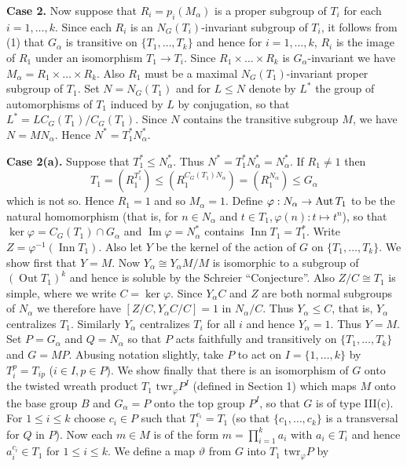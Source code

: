 \textbf{Case 2.} Now suppose that $R_i = p_i(M_\alpha)$ is a proper subgroup of $T_i$ for each $i=1, \dots, k$. Since each $R_i$ is an $N_G(T_i)$-invariant subgroup of $T_i$, it follows from (1) that $G_\alpha$ is transitive on $\{T_1, \dots, T_k\}$ and hence for $i=1, \dots, k$, $R_i$ is the image of $R_1$ under an isomorphism $T_1 \to T_i$. Since $R_1 \times \dots \times R_k$ is $G_\alpha$-invariant we have $M_\alpha = R_1 \times \dots \times R_k$. Also $R_1$ must be a maximal $N_G(T_1)$-invariant proper subgroup of $T_1$. Set $N = N_G(T_1)$ and for $L \le N$ denote by $L^*$ the group of automorphisms of $T_1$ induced by $L$ by conjugation, so that $L^* = LC_G(T_1)/C_G(T_1)$. Since $N$ contains the transitive subgroup $M$, we have $N=MN_\alpha$. Hence $N^*=T_1^*N_\alpha^*$.

\textbf{Case 2(a).} Suppose that $T_1^* \le N_\alpha^*$. Thus $N^*=T_1^*N_\alpha^* = N_\alpha^*$. If $R_1 \neq 1$ then
$$T_1 = (R_1^{T_1^*}) \le (R_1^{C_G(T_1)N_\alpha}) = (R_1^{N_\alpha}) \le G_\alpha $$
which is not so. Hence $R_1=1$ and so $M_\alpha=1$. Define $\varphi: N_\alpha \to \operatorname{Aut} T_1$ to be the natural homomorphism (that is, for $n \in N_\alpha$ and $t \in T_1, \varphi(n): t \mapsto t^n$), so that $\ker \varphi = C_G(T_1) \cap G_\alpha$ and $\operatorname{Im} \varphi = N_\alpha^*$ contains $\operatorname{Inn} T_1 = T_1^*$. Write $Z=\varphi^{-1}(\operatorname{Inn} T_1)$. Also let $Y$ be the kernel of the action of $G$ on $\{T_1, \dots, T_k\}$. We show first that $Y=M$. Now $Y_\alpha \cong Y_\alpha M/M$ is isomorphic to a subgroup of $(\operatorname{Out} T_1)^k$ and hence is soluble by the Schreier ``Conjecture''. Also $Z/C \cong T_1$ is simple, where we write $C = \ker \varphi$. Since $Y_\alpha C$ and $Z$ are both normal subgroups of $N_\alpha$ we therefore have $[Z/C, Y_\alpha C/C] = 1$ in $N_\alpha/C$. Thus $Y_\alpha \le C$, that is, $Y_\alpha$ centralizes $T_1$. Similarly $Y_\alpha$ centralizes $T_i$ for all $i$ and hence $Y_\alpha=1$. Thus $Y=M$.
Set $P=G_\alpha$ and $Q=N_\alpha$ so that $P$ acts faithfully and transitively on $\{T_1, \dots, T_k\}$ and $G=MP$. Abusing notation slightly, take $P$ to act on $I=\{1, \dots, k\}$ by $T_i^p = T_{ip}$ ($i \in I, p \in P$). We show finally that there is an isomorphism of $G$ onto the twisted wreath product $T_1 \text{ twr}_\varphi P^I$ (defined in Section 1) which maps $M$ onto the base group $B$ and $G_\alpha=P$ onto the top group $P^I$, so that $G$ is of type III(c). For $1 \le i \le k$ choose $c_i \in P$ such that $T_i^{c_i} = T_1$ (so that $\{c_1, \dots, c_k\}$ is a transversal for $Q$ in $P$). Now each $m \in M$ is of the form $m = \prod_{i=1}^k a_i$ with $a_i \in T_i$ and hence $a_i^{c_i} \in T_1$ for $1 \le i \le k$. We define a map $\vartheta$ from $G$ into $T_1 \text{ twr}_\varphi P$ by
